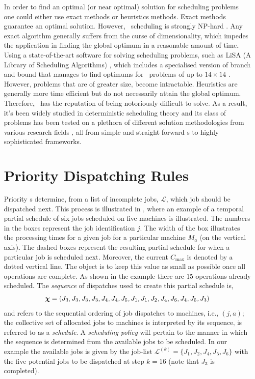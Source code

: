 \documentclass[smallextended]{svjour3}
\begin{document}
In order to find an optimal (or near optimal) solution for scheduling problems 
one could either use exact methods or heuristics methods. Exact methods 
guarantee an optimal solution. However, \jsp\ scheduling is strongly NP-hard 
\cite{Garey76:NPhard}. Any exact algorithm generally suffers from the curse of 
dimensionality, which impedes the application in finding the global optimum in 
a reasonable amount of time. 
Using a state-of-the-art software for solving scheduling problems, such as 
LiSA %
(A Library of Scheduling Algorithms) \cite{LiSA}, which includes a specialised 
version of branch and bound that manages to find optimums for \jsp\ problems of 
up to $14\times14$ \cite{Ru12}. However, problems that are of greater size, 
become intractable. 
Heuristics are generally more time efficient but 
do not necessarily attain the global optimum. Therefore, \jsp\ has the 
reputation of being notoriously difficult to solve. 
As a result, it's been widely studied in deterministic scheduling theory and 
its class of problems has been tested on a plethora of different solution 
methodologies from various research fields \cite{Meeran12}, all from simple and 
straight forward \dr s to highly sophisticated frameworks.


\section{Priority Dispatching Rules} \label{sec:DR}

Priority \dr s determine, from a list of incomplete jobs, 
$\mathcal{L}$, which job should be dispatched next. This process is illustrated 
in , where an example of 
a temporal partial schedule of six-jobs scheduled on five-machines is illustrated. 
The numbers in the boxes represent the job identification $j$. 
The width of the box illustrates the processing times for a given job for a 
particular machine $M_a$ (on the vertical axis). 
The dashed boxes represent the resulting partial schedule for when a particular 
job is scheduled next. 
Moreover, the current $C_{\max}$ is denoted by a dotted vertical line. 
The object is to keep this value as small as possible once all operations are 
complete. As shown in the example there are $15$ operations already scheduled. 
The \textit{sequence} of dispatches used to create this partial schedule is,
\begin{equation}
	\bm \chi=\left(J_3,J_3,J_3,J_3,J_4,J_4,J_5,J_1,J_1,J_2,J_4,J_6,J_4,J_5,J_3\right)
\end{equation}
and refers to the sequential ordering of job dispatches to machines, i.e., $(j,a)$; 
the collective set of allocated jobs to machines is interpreted by its 
sequence, is referred to as a \emph{schedule}.
A \emph{scheduling policy} will pertain to the manner in which 
the sequence is determined from the available jobs to be scheduled. 
In our example the available jobs is given by the job-list
$\mathcal{L}^{(k)}=\{J_1,J_2,J_4,J_5,J_6\}$ with the five potential jobs 
to be dispatched at step $k=16$ (note that $J_3$ is completed).
\end{document}
